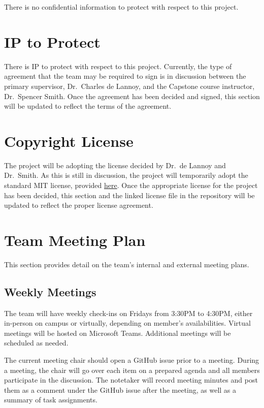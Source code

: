 \documentclass{article}
\begin{document}
There is no confidential information to protect with respect to this project.

\section{IP to Protect}

There is IP to protect with respect to this project. Currently, the type of
agreement that the team may be required to sign is in discussion between the
primary supervisor, Dr.\ Charles de Lannoy, and the Capstone course instructor,
Dr.\ Spencer Smith. Once the agreement has been decided and signed, this section
will be updated to reflect the terms of the agreement.

\section{Copyright License}

The project will be adopting the license decided by Dr.\ de Lannoy and Dr.\
Smith. As this is still in discussion, the project will temporarily adopt the
standard MIT license, provided
\href{https://github.com/SumanyaG/Alkalytics/blob/main/LICENSE}{here}. Once the
appropriate license for the project has been decided, this section and the
linked license file in the repository will be updated to reflect the proper
license agreement.

\section{Team Meeting Plan}
This section provides detail on the team's internal and external meeting plans.
\subsection{Weekly Meetings}
The team will have weekly check-ins on Fridays from 3:30PM to 4:30PM, either
in-person on campus or virtually, depending on member's availabilities. Virtual
meetings will be hosted on Microsoft Teams. Additional meetings will be
scheduled as needed.\newline

\noindent The current meeting chair should open a GitHub issue prior to a
meeting. During a meeting, the chair will go over each item on a prepared agenda
and all members participate in the discussion. The notetaker will record meeting
minutes and post them as a comment under the GitHub issue after the meeting, as
well as a summary of task assignments.
\end{document}
